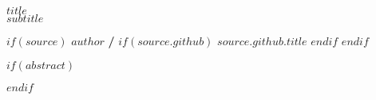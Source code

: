 \begin{center}
  \vspace*{0.5cm}
  
  \textbf{\Huge $title$}\\
  \vspace{0.1cm}
  \textsf{\textit{\large $subtitle$}}
  
  \vspace{0.5cm}
$if(source)$
  \textsf{\large $author$ \hspace{0.3cm}\textbf{/}\hspace{0.3cm}\large
  $if(source.github)$  \faGithub\space \href{$source.github.link$}{$source.github.title$} $endif$
  }
$endif$
\end{center}

$if(abstract)$
\begin{abstract}
$abstract$
\end{abstract}
$endif$
